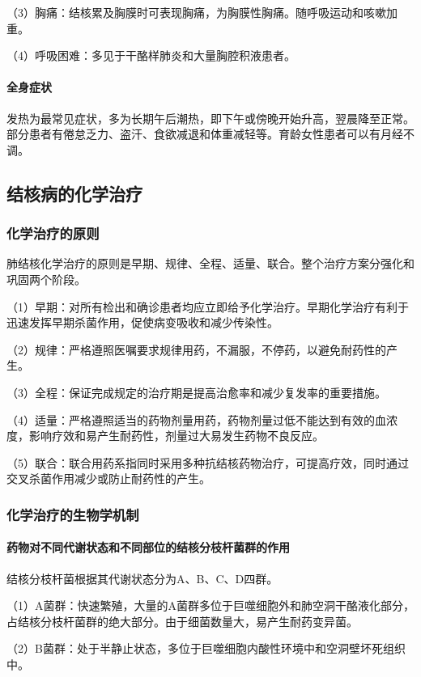 （3）胸痛：结核累及胸膜时可表现胸痛，为胸膜性胸痛。随呼吸运动和咳嗽加重。

（4）呼吸困难：多见于干酪样肺炎和大量胸腔积液患者。
\paragraph{全身症状}

发热为最常见症状，多为长期午后潮热，即下午或傍晚开始升高，翌晨降至正常。部分患者有倦怠乏力、盗汗、食欲减退和体重减轻等。育龄女性患者可以有月经不调。

\subsection{结核病的化学治疗}

\subsubsection{化学治疗的原则}

肺结核化学治疗的原则是早期、规律、全程、适量、联合。整个治疗方案分强化和巩固两个阶段。

（1）早期：对所有检出和确诊患者均应立即给予化学治疗。早期化学治疗有利于迅速发挥早期杀菌作用，促使病变吸收和减少传染性。

（2）规律：严格遵照医嘱要求规律用药，不漏服，不停药，以避免耐药性的产生。

（3）全程：保证完成规定的治疗期是提高治愈率和减少复发率的重要措施。

（4）适量：严格遵照适当的药物剂量用药，药物剂量过低不能达到有效的血浓度，影响疗效和易产生耐药性，剂量过大易发生药物不良反应。

（5）联合：联合用药系指同时采用多种抗结核药物治疗，可提高疗效，同时通过交叉杀菌作用减少或防止耐药性的产生。

\subsubsection{化学治疗的生物学机制}
\paragraph{药物对不同代谢状态和不同部位的结核分枝杆菌群的作用}

结核分枝杆菌根据其代谢状态分为A、B、C、D四群。

（1）A菌群：快速繁殖，大量的A菌群多位于巨噬细胞外和肺空洞干酪液化部分，占结核分枝杆菌群的绝大部分。由于细菌数量大，易产生耐药变异菌。

（2）B菌群：处于半静止状态，多位于巨噬细胞内酸性环境中和空洞壁坏死组织中。

